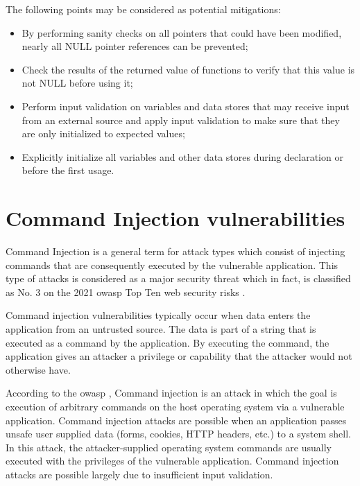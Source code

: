 The following  points may be considered as potential mitigations:
\begin{itemize}
\item By performing sanity checks on all pointers that could have been modified, nearly all NULL pointer references can be prevented;
\item  Check the results of the returned value of functions to verify that this value is not NULL before using it;
\item  Perform input validation on variables and data stores that may receive input from an external source and apply input validation to make sure that they are only initialized to expected values;
\item  Explicitly initialize all variables and other data stores during declaration or before the first usage.
\end{itemize}


\section{Command Injection vulnerabilities} %
\label{sub: Command_Injection_vulnerabilities}

Command Injection is a general term for attack types which consist of injecting commands that are consequently executed by the vulnerable application. This type of attacks is considered as a major security threat which in fact,  is  classified  as  No. 3  on  the  2021  \gls{owasp} Top  Ten  web  security  risks \cite{OWASP_TOP_TEN2021}.

Command injection vulnerabilities typically occur when data enters the application from an untrusted source. The data is part of a string that is executed as a command by the application. By executing the command, the application gives an attacker a privilege or capability that the attacker would not otherwise have.

According to the \gls{owasp} \cite{Weilin_Zhong2023}, Command injection is an attack in which the goal is execution of arbitrary commands on the host operating system via a vulnerable application. Command injection attacks are possible when an application passes unsafe user supplied data (forms, cookies, HTTP headers, etc.) to a system shell. In this attack, the attacker-supplied operating system commands are usually executed with the privileges of the vulnerable application. Command injection attacks are possible largely due to insufficient input validation.

